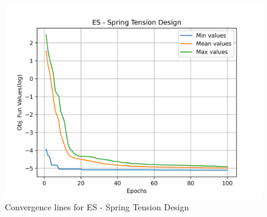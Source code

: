 \begin{figure}[H]
\centering
\caption{Convergence lines for ES - Spring Tension Design}
\label{fig:spring_problem_solve_es}
\includegraphics[scale=0.5]{images/spring_problem_solve_es.png}
\end{figure}
        